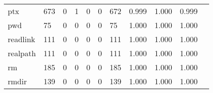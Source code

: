 \begin{longtable}{lp{1.2cm}p{1.2cm}p{1.2cm}p{1.2cm}p{1.2cm}p{1.2cm}p{1.2cm}p{1.2cm}p{1.2cm}p{1.2cm}}
ptx       &                                   673 &                                                  0 &                                                  1 &                                                  0 &                                                  0 &                                                672 &                                         0.999 &                                              1.000 &                                              0.999 \\
pwd       &                                    75 &                                                  0 &                                                  0 &                                                  0 &                                                  0 &                                                 75 &                                         1.000 &                                              1.000 &                                              1.000 \\
readlink  &                                   111 &                                                  0 &                                                  0 &                                                  0 &                                                  0 &                                                111 &                                         1.000 &                                              1.000 &                                              1.000 \\
realpath  &                                   111 &                                                  0 &                                                  0 &                                                  0 &                                                  0 &                                                111 &                                         1.000 &                                              1.000 &                                              1.000 \\
rm        &                                   185 &                                                  0 &                                                  0 &                                                  0 &                                                  0 &                                                185 &                                         1.000 &                                              1.000 &                                              1.000 \\
rmdir     &                                   139 &                                                  0 &                                                  0 &                                                  0 &                                                  0 &                                                139 &                                         1.000 &                                              1.000 &                                              1.000 \\

\end{longtable}
